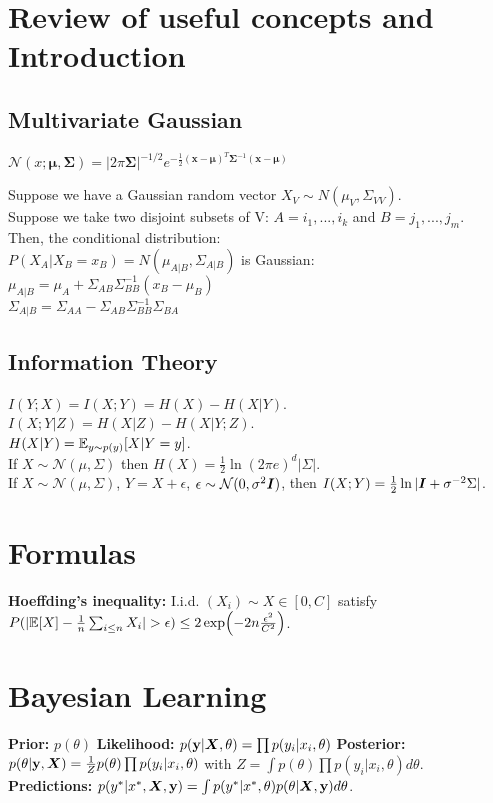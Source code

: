 \section{Review of useful concepts and Introduction}
\subsection{Multivariate Gaussian}
$\mathcal{N}(x;\bm{\mu}, \bm{\Sigma})= |2\pi\bm{\Sigma}|^{-1/2} e^{-\frac{1}{2}(\mathbf{x}-\bm{\mu})^T\bm{\Sigma}^{-1}(\mathbf{x}-\bm{\mu})} $

Suppose we have a Gaussian random vector $X_V \sim N(\mu_V, \Sigma_{VV})$.\\
Suppose we take two disjoint subsets of V: $A={i_1,...,i_k}$ and $B={j_1,...,j_m}$.\\
Then, the conditional distribution: \\
$P(X_A|X_B=x_B)=N(\mu_{A|B}, \Sigma_{A|B})$ is Gaussian:\\
$\mu_{A|B}=\mu_A+\Sigma_{AB}\Sigma^{-1}_{BB}(x_B-\mu_B)$\\
$\Sigma_{A|B}=\Sigma_{AA}-\Sigma_{AB}\Sigma^{-1}_{BB}\Sigma_{BA}$

\subsection{Information Theory}
$I(Y;X) = I(X;Y) = H(X) - H(X|Y)$.\\
$I(X;Y|Z) = H(X|Z) - H(X|Y;Z)$.\\
$H(X|Y) = \mathbb{E}_{y\sim p(y)}[X|Y=y]$.\\
If $X\sim\mathcal{N}(\mu, \Sigma)$ then $H(X) = \frac{1}{2}\ln(2\pi e)^d|\Sigma|$.\\
If $X\sim\mathcal{N}(\mu, \Sigma)$, $Y = X + \epsilon$, $\epsilon\sim\mathcal{N}(0,\sigma^2{\bm{I}})$, then $I(X;Y) = \frac{1}{2}\ln|{\bm{I}}+\sigma^{-2}\Sigma|$.

\section{Formulas}
\textbf{Hoeffding's inequality:} I.i.d. $(X_i)\sim X\in[0,C]$ satisfy $P(|\E[X] - \frac{1}{n}\sum_{i\leq n}X_i|>\epsilon) \leq 2\exp(-2n\frac{\epsilon^2}{C^2})$.

\section{Bayesian Learning}
\textbf{Prior:} $p(\theta)$
\textbf{Likelihood:} $p({\mathbf{y}}|{\bm{X}},\theta) = \prod p(y_i|x_i,\theta)$
\textbf{Posterior:} $p(\theta|{\mathbf{y}},{\bm{X}}) = \frac{1}{Z}p(\theta)\prod p(y_i|x_i, \theta)$ with $Z = \int p(\theta)\prod p(y_i|x_i, \theta) d\theta$.
\textbf{Predictions:} $p(y^*|x^*,{\bm{X}},{\mathbf{y}}) = \int p(y^*|x^*,\theta)p(\theta|{\bm{X}}, {\mathbf{y}}) d\theta$. 


